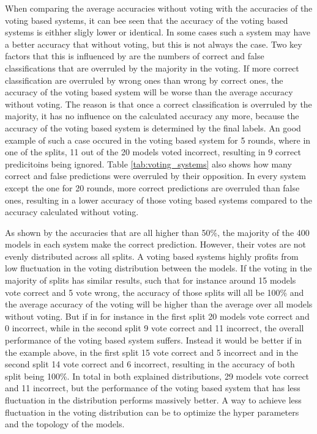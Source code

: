 When comparing the average accuracies without voting with the accuracies of the voting based systems, it can bee seen that the accuracy of the voting based systems is eithher sligly lower or identical. In some cases such a system may have a better accuracy that without voting, but this is not always the case. Two key factors that this is influenced by are the numbers of correct and false classifications that are overruled by the majority in the voting. If more correct classification are overruled by wrong ones than wrong by correct ones, the accuracy of the voting based system will be worse than the average accuracy without voting. The reason is that once a correct classification is overruled by the majority, it has no influence on the calculated accuracy any more, because the accuracy of the voting based system is determined by the final labels. An good example of such a case occured in the voting based system for 5 rounds, where in one of the splits, 11 out of the 20 models voted incorrect, resulting in 9 correct predicitoins being ignored. Table \ref{tab:voting_systems} also shows how many correct and false predictions were overruled by their opposition. In every system except the one for 20 rounds, more correct predictions are overruled than false ones, resulting in a lower accuracy of those voting based systems compared to the accuracy calculated without voting. 

As shown by the accuracies that are all higher than 50\%, the majority of the 400 models in each system make the correct prediction. However, their votes are not evenly distributed across all splits. A voting based systems highly profits from low fluctuation in the voting distribution between the models. If the voting in the majority of splits has similar results, such that for instance around 15 models vote correct and 5 vote wrong, the accuracy of those splits will all be 100\% and the average accuracy of the voting will be higher than the average over all models without voting. But if in for instance in the first split 20 models vote correct and 0 incorrect, while in the second split 9 vote correct and 11 incorrect, the overall performance of the voting based system suffers. Instead it would be better if in the example above, in the first split 15 vote correct and 5 incorrect and in the second split 14 vote correct and 6 incorrect, resulting in the accuracy of both split being 100\%. In total in both explained distributions, 29 models vote correct and 11 incorrect, but the performance of the voting based system that has less fluctuation in the distribution performs massively better. A way to achieve less fluctuation in the voting distribution can be to optimize the hyper parameters and the topology of the models.

